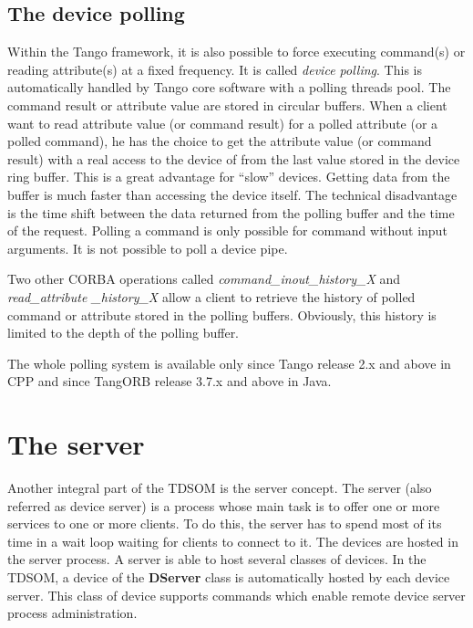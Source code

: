 \subsection{The device polling}

Within the Tango framework, it is also possible to force executing
command(s) or reading attribute(s) at a fixed frequency. It is called
\emph{device polling}. This is automatically handled by Tango core
software with a polling threads pool. The command result or attribute
value are stored in circular buffers. When a client want to read attribute
value (or command result) for a polled attribute (or a polled command),
he has the choice to get the attribute value (or command result) with
a real access to the device of from the last value stored in the device
ring buffer. This is a great advantage for ``slow'' devices. Getting
data from the buffer is much faster than accessing the device itself.
The technical disadvantage is the time shift between the data returned
from the polling buffer and the time of the request. Polling a command
is only possible for command without input arguments. It is not possible
to poll a device pipe.

Two other CORBA operations called \emph{command\_inout\_history\_X}
and \emph{read\_attribute \_history\_X}
allow a client to retrieve the history of polled command or attribute
stored in the polling buffers. Obviously, this history is limited
to the depth of the polling buffer. 

The whole polling system is available only since Tango release 2.x
and above in CPP and since TangORB release 3.7.x and above in Java.


\section{The server}

Another integral part of the TDSOM is the server concept. The server
(also referred as device server) is a process whose
main task is to offer one or more services to one or more clients.
To do this, the server has to spend most of its time in a wait loop
waiting for clients to connect to it. The devices are hosted in the
server process. A server is able to host several classes of devices.
In the TDSOM, a device of the \textbf{DServer} class is automatically
hosted by each device server. This class of device supports commands
which enable remote device server process administration.


